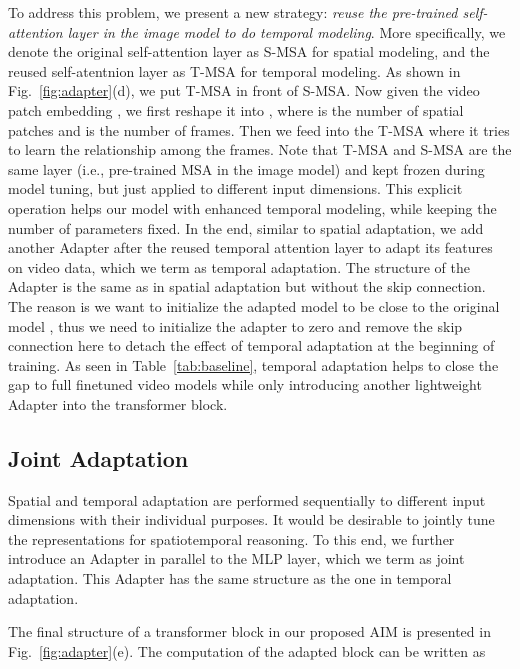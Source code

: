 \documentclass{article} \usepackage{iclr2023_conference,times}
\begin{document}
	To address this problem, we present a new strategy: \textit{reuse the pre-trained self-attention layer in the image model to do temporal modeling}. 
	More specifically, we denote the original self-attention layer as S-MSA for spatial modeling, and the reused self-atentnion layer as T-MSA for temporal modeling. 
	As shown in Fig.\ \ref{fig:adapter}(d), we put T-MSA in front of S-MSA. 
	Now given the video patch embedding ,  we first reshape it into , where  is the number of spatial patches and  is the number of frames. 
	Then we feed  into the T-MSA where it tries to learn the relationship among the  frames. 
	Note that T-MSA and S-MSA are the same layer (i.e., pre-trained MSA in the image model) and kept frozen during model tuning, but just applied to different input dimensions. 
	This explicit operation helps our model with enhanced temporal modeling, while keeping the number of parameters fixed.
	In the end, similar to spatial adaptation, we add another Adapter after the reused temporal attention layer to adapt its features on video data, which we term as temporal adaptation.
	The structure of the Adapter is the same as in spatial adaptation but without the skip connection. 
	The reason is we want to initialize the adapted model to be close to the original model \citep{adapter}, thus we need to initialize the adapter to zero and remove the skip connection here to detach the effect of temporal adaptation at the beginning of training. 
As seen in Table~\ref{tab:baseline}, temporal adaptation helps to close the gap to full finetuned video models while only introducing another lightweight Adapter into the transformer block.
	


	\subsection{Joint Adaptation}
	\label{subsec:joint module}
	
	Spatial and temporal adaptation are performed sequentially to different input dimensions with their individual purposes. 
	It would be desirable to jointly tune the  representations for spatiotemporal reasoning. 
	To this end, we further introduce an Adapter in parallel to the MLP layer, which we term as joint adaptation. 
This Adapter has the same structure as the one in temporal adaptation.


	The final structure of a transformer block in our proposed AIM is presented in Fig.\ \ref{fig:adapter}(e). 
	The computation of the adapted block can be written as
	
\end{document}
